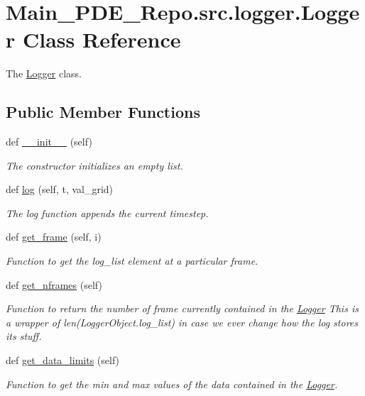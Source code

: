 \hypertarget{classMain__PDE__Repo_1_1src_1_1logger_1_1Logger}{}\section{Main\+\_\+\+P\+D\+E\+\_\+\+Repo.\+src.\+logger.\+Logger Class Reference}
\label{classMain__PDE__Repo_1_1src_1_1logger_1_1Logger}


The \hyperlink{classMain__PDE__Repo_1_1src_1_1logger_1_1Logger}{Logger} class.  


\subsection*{Public Member Functions}
\begin{DoxyCompactItemize}
\item 
def \hyperlink{classMain__PDE__Repo_1_1src_1_1logger_1_1Logger_a1cb1b576ea43629aba66f291b97099e2}{\+\_\+\+\_\+init\+\_\+\+\_\+} (self)
\begin{DoxyCompactList}\small\item\em The constructor initializes an empty list. \end{DoxyCompactList}\item 
def \hyperlink{classMain__PDE__Repo_1_1src_1_1logger_1_1Logger_a5028b1f1929f7124fc5322aaa917f118}{log} (self, t, val\+\_\+grid)
\begin{DoxyCompactList}\small\item\em The log function appends the current timestep. \end{DoxyCompactList}\item 
def \hyperlink{classMain__PDE__Repo_1_1src_1_1logger_1_1Logger_a07a3ec736e4a23eb8738f52fc0d27248}{get\+\_\+frame} (self, i)
\begin{DoxyCompactList}\small\item\em Function to get the log\+\_\+list element at a particular frame. \end{DoxyCompactList}\item 
def \hyperlink{classMain__PDE__Repo_1_1src_1_1logger_1_1Logger_a3a9c0a4d4efcc23c16de9f19652cb552}{get\+\_\+nframes} (self)
\begin{DoxyCompactList}\small\item\em Function to return the number of frame currently contained in the \hyperlink{classMain__PDE__Repo_1_1src_1_1logger_1_1Logger}{Logger} This is a wrapper of len(Logger\+Object.\+log\+\_\+list) in case we ever change how the log stores its stuff. \end{DoxyCompactList}\item 
def \hyperlink{classMain__PDE__Repo_1_1src_1_1logger_1_1Logger_af80ede43eb3e9305a18b9ede9f2a8607}{get\+\_\+data\+\_\+limits} (self)
\begin{DoxyCompactList}\small\item\em Function to get the min and max values of the data contained in the \hyperlink{classMain__PDE__Repo_1_1src_1_1logger_1_1Logger}{Logger}. \end{DoxyCompactList}\end{DoxyCompactItemize}
